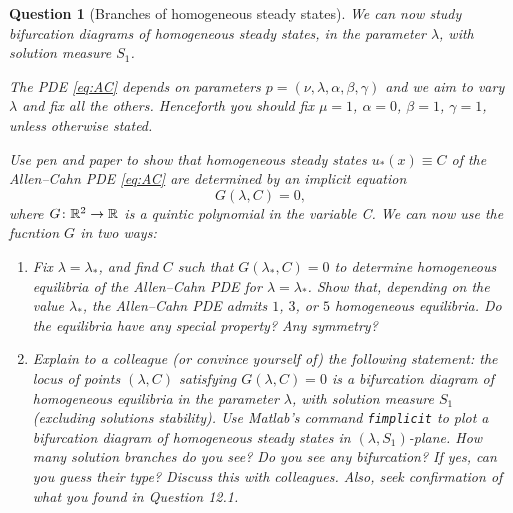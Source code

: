 \documentclass[a4paper]{siamart220329}
\theoremstyle{plain}
\newtheorem{question}{Question}
\begin{document}
\begin{question}[Branches of homogeneous steady states] We can now study
bifurcation diagrams of homogeneous steady states, in the parameter $\lambda$, with
solution measure $S_1$. 

The PDE \cref{eq:AC} depends on parameters $p =
(\nu,\lambda,\alpha,\beta,\gamma)$ and we aim to vary $\lambda$ and fix all the
others. Henceforth you should fix $\mu = 1$, $\alpha=0$, $\beta=1$, $\gamma =1$,
unless otherwise stated.

Use pen and paper to show that homogeneous steady states
$u_*(x)\equiv C$ of the Allen--Cahn PDE \cref{eq:AC} are determined by an implicit
equation
\[
  G(\lambda,C) = 0,
\]
where $G \colon \mathbb{R}^2 \to \mathbb{R}$ is a quintic polynomial in the variable C. We can now use the
fucntion $G$ in two ways: 
\begin{enumerate}
 \item Fix $\lambda = \lambda_*$, and find $C$ such that
   $G(\lambda_*,C) = 0$ to determine homogeneous equilibria of the Allen--Cahn PDE
   for $\lambda = \lambda_*$. Show that, depending on the value $\lambda_*$, the
   Allen--Cahn PDE admits $1$, $3$, or $5$ homogeneous equilibria. Do the equilibria
   have any special property? Any symmetry?
 \item 
   Explain to a colleague (or convince yourself of) the following statement: \textit{the
   locus of points $(\lambda,C)$
   satisfying $G(\lambda,C) = 0$ is a bifurcation diagram of homogeneous equilibria
   in the parameter $\lambda$, with solution measure $S_1$ (excluding solutions
   stability).}
   Use Matlab's command \lstinline|fimplicit| to plot a
   bifurcation diagram of homogeneous steady states in $(\lambda,S_1)$-plane. How
   many solution branches do you see? Do you see any bifurcation? If yes, can you
   guess their type? Discuss this with colleagues. Also, seek confirmation of what you found in
   Question 12.1.
\end{enumerate}
\end{question}

% 
% 
\end{document}
